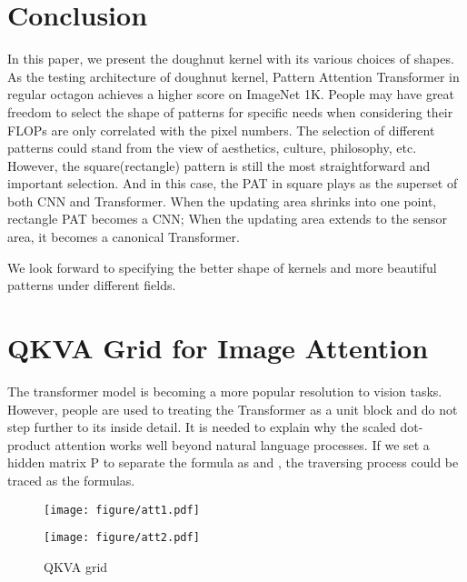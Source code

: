 \documentclass{article}
\theoremstyle{plain}
\theoremstyle{definition}
\theoremstyle{remark}
\begin{document}
\section{Conclusion}
In this paper, we present the doughnut kernel with its various choices of shapes. As the testing architecture of doughnut kernel, Pattern Attention Transformer in regular octagon achieves a higher score on ImageNet 1K. People may have great freedom to select the shape of patterns for specific needs when considering their FLOPs are only correlated with the pixel numbers. The selection of different patterns could stand from the view of aesthetics, culture, philosophy, etc. However, the square(rectangle) pattern is still the most straightforward and important selection. And in this case, the PAT in square plays as the superset of both CNN and Transformer. When the updating area shrinks into one point, rectangle PAT becomes a CNN; When the updating area extends to the sensor area, it becomes a canonical Transformer.

We look forward to specifying the better shape of kernels and more beautiful patterns under different fields.






\newpage
\appendix
\onecolumn
\section{QKVA Grid for Image Attention}
\label{appendix_qkva}
The transformer \cite{vaswani2017attention} model is becoming a more popular resolution to vision tasks. However, people are used to treating the Transformer as a unit block and do not step further to its inside detail. It is needed to explain why the scaled dot-product attention works well beyond natural language processes. If we set a hidden matrix P to separate the formula as  and , the traversing process could be traced as the formulas. 
\begin{figure}[h]
  \centering
  \begin{minipage}[t]{0.65\textwidth}
  \centering
  \texttt{[image: figure/att1.pdf]}
  \caption{}
  \label{fig:att1}
  \end{minipage}
  \begin{minipage}[t]{0.3\textwidth} 
  \centering  
  \texttt{[image: figure/att2.pdf]}
  \caption{QKVA grid}
  \label{fig:att2}
  \end{minipage}   
\end{figure}
\end{document}
